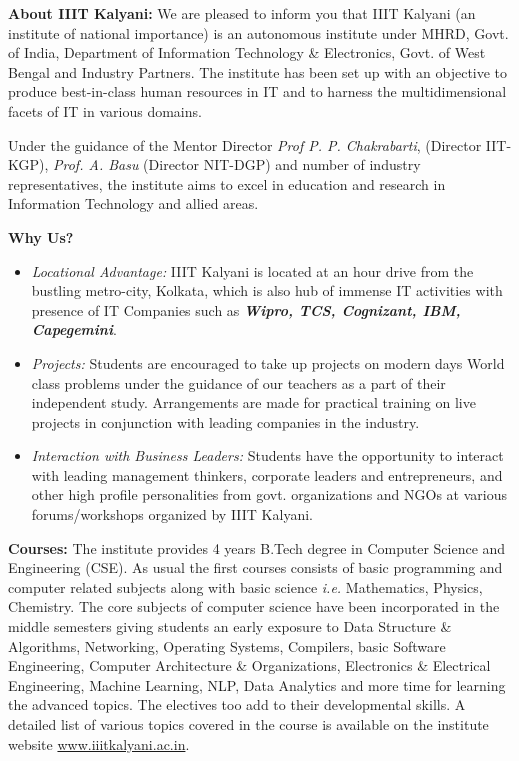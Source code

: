 \documentclass[hidelinks, 11pt, a4paper]{letter}
\begin{document}
\begin{letter}{}
\textbf{About IIIT Kalyani:} We are pleased to inform you that IIIT Kalyani (an institute of national importance) is an autonomous institute under MHRD, Govt. of India, Department of Information Technology \& Electronics, Govt. of West Bengal and Industry Partners. The institute has been set up with an objective to produce best-in-class human resources in IT and to harness the multidimensional facets of IT in various domains.
	\par Under the guidance of the Mentor Director \textit{Prof P. P. Chakrabarti}, (Director IIT-KGP), \textit{Prof. A. Basu} (Director NIT-DGP) and number of industry representatives, the institute aims to excel in education and research in Information Technology and allied areas.

\textbf{Why Us?} 
	\begin{itemize}
		\item \textit{Locational Advantage:} IIIT Kalyani is located at an hour drive from the bustling metro-city, Kolkata, which is also hub of immense IT activities with presence of IT Companies such as \textit{\textbf{Wipro, TCS, Cognizant, IBM, Capegemini}}.
		\item \textit{Projects:} Students are encouraged to take up projects on modern days World class problems under the guidance of our teachers as a part of their independent study. Arrangements are made for practical training on live projects in conjunction with leading companies in the industry.
		\item \textit{Interaction with Business Leaders:} Students have the opportunity to interact with leading management thinkers, corporate leaders and entrepreneurs, and other high profile personalities from govt. organizations and NGOs at various forums/workshops organized by IIIT Kalyani.
	\end{itemize}

\textbf{Courses:}
	The institute provides 4 years B.Tech degree in Computer Science and Engineering (CSE). As usual the first courses consists of basic programming and computer related subjects along with basic science \textit{i.e.} Mathematics, Physics, Chemistry. The core subjects of computer science have been incorporated in the middle semesters giving students an early exposure to Data Structure \& Algorithms, Networking, Operating Systems, Compilers, basic Software Engineering, Computer Architecture \& Organizations, Electronics \& Electrical Engineering, Machine Learning, NLP, Data Analytics and more time for learning the advanced topics. The electives too add to their developmental skills. A detailed list of various topics covered in the course is available on the institute website \url{www.iiitkalyani.ac.in}.


\end{letter}
\end{document}
